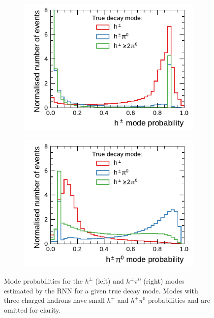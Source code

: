 \begin{figure}[htb]
  \begin{subfigure}[t]{0.48\textwidth}
    \centering
    \includegraphics{./figures/decay_mode_classification/mode_proba_baseline_ptcut_1_5_only_1p/proba_1p0n.pdf}
    \vspace*{-1.6em}
    \label{fig:1p0n_proba}
  \end{subfigure}\hfill
  \begin{subfigure}[t]{0.48\textwidth}
    \centering
    \includegraphics{./figures/decay_mode_classification/mode_proba_baseline_ptcut_1_5_only_1p/proba_1p1n.pdf}
    \vspace*{-1.6em}
    \label{fig:1p1n_proba}
  \end{subfigure}
  \caption[Mode probability estimates of the RNN-based decay mode
  classification]{Mode probabilities for the $h^\pm$ (left) and $h^\pm \pi^0$
    (right) modes estimated by the RNN for a given true decay mode. Modes with
    three charged hadrons have small $h^\pm$ and $h^\pm \pi^0$ probabilities and
    are omitted for clarity.}
  \label{fig:mode_proba_ptcut}
\end{figure}

